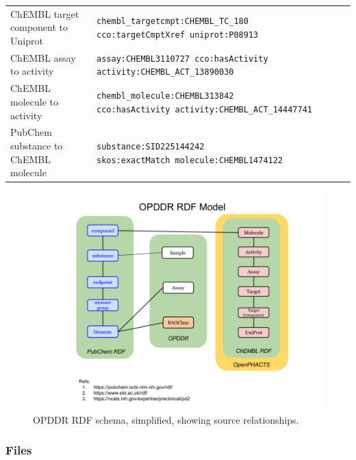 \begin{table}[]
\begin{tabular}{p{0.25\linewidth}p{0.75\linewidth}}
ChEMBL target component to Uniprot & \makecell[l]{\texttt{chembl\_targetcmpt:CHEMBL\_TC\_180} \\ \texttt{cco:targetCmptXref uniprot:P08913}} \\
ChEMBL assay to activity & \makecell[l]{\texttt{assay:CHEMBL3110727 cco:hasActivity} \\ \texttt{activity:CHEMBL\_ACT\_13890030}} \\
ChEMBL molecule to activity & \makecell[l]{\texttt{chembl\_molecule:CHEMBL313842} \\ \texttt{cco:hasActivity activity:CHEMBL\_ACT\_14447741}} \\
PubChem substance to ChEMBL molecule & \makecell[l]{\texttt{substance:SID225144242} \\ \texttt{skos:exactMatch molecule:CHEMBL1474122}}  \\
\hline
\end{tabular}
\end{table}

\begin{figure}
    \centering
    \includegraphics[width=\linewidth]{figures/opddr/OPDDR_schema.png}
    \caption{OPDDR RDF schema, simplified, showing source relationships.}
    \label{fig:opddr_01}
\end{figure}

\subsubsection{Files}

